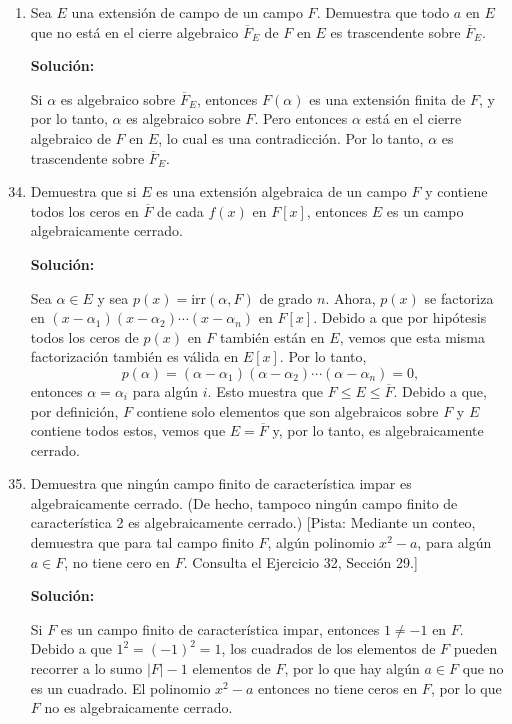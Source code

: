 \begin{enumerate}
    \item Sea $E$ una extensión de campo de un campo $F$. Demuestra que todo $a$ en $E$ que no está en el cierre algebraico $\overline{F}_E$ de $F$ en $E$ es trascendente sobre $\overline{F}_E$.
    
    \textbf{Solución:}
    
    Si $\alpha$ es algebraico sobre $\overline{F}_E$, entonces $F(\alpha)$ es una extensión finita de $F$, y por lo tanto, $\alpha$ es algebraico sobre $F$. Pero entonces $\alpha$ está en el cierre algebraico de $F$ en $E$, lo cual es una contradicción. Por lo tanto, $\alpha$ es trascendente sobre $\overline{F}_E$.
    
\end{enumerate}


\begin{enumerate}
    \setcounter{enumi}{33}
    
    \item Demuestra que si $E$ es una extensión algebraica de un campo $F$ y contiene todos los ceros en $\overline{F}$ de cada $f(x)$ en $F[x]$, entonces $E$ es un campo algebraicamente cerrado.
    
    \textbf{Solución:}
    
    Sea $\alpha \in E$ y sea $p(x) = \text{irr}(\alpha, F)$ de grado $n$. Ahora, $p(x)$ se factoriza en $(x - \alpha_1)(x - \alpha_2) \cdots (x - \alpha_n)$ en $F[x]$. Debido a que por hipótesis todos los ceros de $p(x)$ en $F$ también están en $E$, vemos que esta misma factorización también es válida en $E[x]$. Por lo tanto,
    \[ p(\alpha) = (\alpha - \alpha_1)(\alpha - \alpha_2) \cdots (\alpha - \alpha_n) = 0, \]
    entonces $\alpha = \alpha_i$ para algún $i$. Esto muestra que $F \leq E \leq \overline{F}$. Debido a que, por definición, $F$ contiene solo elementos que son algebraicos sobre $F$ y $E$ contiene todos estos, vemos que $E = \overline{F}$ y, por lo tanto, es algebraicamente cerrado.
    
    \item Demuestra que ningún campo finito de característica impar es algebraicamente cerrado. (De hecho, tampoco ningún campo finito de característica 2 es algebraicamente cerrado.) [Pista: Mediante un conteo, demuestra que para tal campo finito $F$, algún polinomio $x^2 - a$, para algún $a \in F$, no tiene cero en $F$. Consulta el Ejercicio 32, Sección 29.]
    
    \textbf{Solución:}
    
    Si $F$ es un campo finito de característica impar, entonces $1 \neq -1$ en $F$. Debido a que $1^2 = (-1)^2 = 1$, los cuadrados de los elementos de $F$ pueden recorrer a lo sumo $|F| - 1$ elementos de $F$, por lo que hay algún $a \in F$ que no es un cuadrado. El polinomio $x^2 - a$ entonces no tiene ceros en $F$, por lo que $F$ no es algebraicamente cerrado.
    
\end{enumerate}


